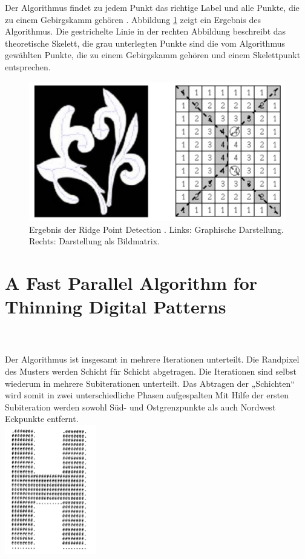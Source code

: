 Der Algorithmus findet zu jedem Punkt das richtige Label und alle Punkte, die zu einem Gebirgskamm gehören \cite{extracting_skeletons_distancemaps}. Abbildung \ref{fig:paper_ergebnis} zeigt ein Ergebnis des Algorithmus. Die gestrichelte Linie in der rechten Abbildung beschreibt das theoretische Skelett, die grau unterlegten Punkte sind die vom Algorithmus gewählten Punkte, die zu einem Gebirgskamm gehören und einem Skelettpunkt entsprechen.
\begin{figure}
\centering
\includegraphics[width=0.7\linewidth]{./fig/paper_ergebnis}
\caption{Ergebnis der Ridge Point Detection \cite{extracting_skeletons_distancemaps}. Links: Graphische Darstellung. Rechts: Darstellung als Bildmatrix. }
\label{fig:paper_ergebnis}
\end{figure}
\newpage
\section{A Fast Parallel Algorithm for Thinning Digital Patterns} 
\\\\
Der Algorithmus ist insgesamt in mehrere Iterationen unterteilt. Die Randpixel des Musters werden Schicht für Schicht abgetragen. Die Iterationen sind selbst wiederum in mehrere Subiterationen unterteilt. Das Abtragen der „Schichten“ wird somit in zwei unterschiedliche Phasen aufgespalten
Mit Hilfe der ersten Subiteration werden sowohl Süd- und Ostgrenzpunkte als auch Nordwest Eckpunkte entfernt. \\


\includegraphics[width=4cm]{Res/SuedOst.png}


